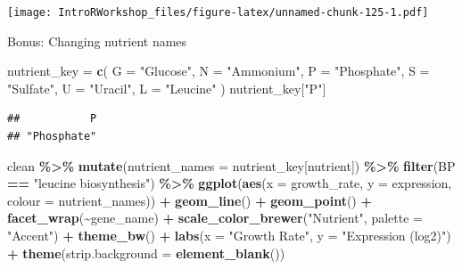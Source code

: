 \documentclass[
]{book}
\newenvironment{Shaded}{\begin{snugshade}}{\end{snugshade}}
\newcommand{\AttributeTok}[1]{\textcolor[rgb]{0.13,0.29,0.53}{#1}}
\newcommand{\FunctionTok}[1]{\textcolor[rgb]{0.13,0.29,0.53}{\textbf{#1}}}
\newcommand{\NormalTok}[1]{#1}
\newcommand{\OtherTok}[1]{\textcolor[rgb]{0.56,0.35,0.01}{#1}}
\newcommand{\SpecialCharTok}[1]{\textcolor[rgb]{0.81,0.36,0.00}{\textbf{#1}}}
\newcommand{\StringTok}[1]{\textcolor[rgb]{0.31,0.60,0.02}{#1}}
\begin{document}
\texttt{[image: IntroRWorkshop\_files/figure-latex/unnamed-chunk-125-1.pdf]}

Bonus: Changing nutrient names

\begin{Shaded}
\begin{Highlighting}[]
\NormalTok{nutrient\_key }\OtherTok{=} \FunctionTok{c}\NormalTok{(}
  \AttributeTok{G =} \StringTok{"Glucose"}\NormalTok{,}
  \AttributeTok{N =} \StringTok{"Ammonium"}\NormalTok{,}
  \AttributeTok{P =} \StringTok{"Phosphate"}\NormalTok{,}
  \AttributeTok{S =} \StringTok{"Sulfate"}\NormalTok{,}
  \AttributeTok{U =} \StringTok{"Uracil"}\NormalTok{,}
  \AttributeTok{L =} \StringTok{"Leucine"}
\NormalTok{)}
\NormalTok{nutrient\_key[}\StringTok{"P"}\NormalTok{]}
\end{Highlighting}
\end{Shaded}

\begin{verbatim}
##           P 
## "Phosphate"
\end{verbatim}

\begin{Shaded}
\begin{Highlighting}[]
\NormalTok{clean }\SpecialCharTok{\%\textgreater{}\%}
  \FunctionTok{mutate}\NormalTok{(}\AttributeTok{nutrient\_names =}\NormalTok{ nutrient\_key[nutrient]) }\SpecialCharTok{\%\textgreater{}\%}
    \FunctionTok{filter}\NormalTok{(BP }\SpecialCharTok{==} \StringTok{"leucine biosynthesis"}\NormalTok{) }\SpecialCharTok{\%\textgreater{}\%}
    \FunctionTok{ggplot}\NormalTok{(}\FunctionTok{aes}\NormalTok{(}\AttributeTok{x =}\NormalTok{ growth\_rate, }\AttributeTok{y =}\NormalTok{ expression, }\AttributeTok{colour =}\NormalTok{ nutrient\_names)) }\SpecialCharTok{+}
    \FunctionTok{geom\_line}\NormalTok{() }\SpecialCharTok{+}
    \FunctionTok{geom\_point}\NormalTok{() }\SpecialCharTok{+}
    \FunctionTok{facet\_wrap}\NormalTok{(}\SpecialCharTok{\textasciitilde{}}\NormalTok{gene\_name) }\SpecialCharTok{+}
    \FunctionTok{scale\_color\_brewer}\NormalTok{(}\StringTok{"Nutrient"}\NormalTok{, }\AttributeTok{palette =} \StringTok{"Accent"}\NormalTok{) }\SpecialCharTok{+}
    \FunctionTok{theme\_bw}\NormalTok{() }\SpecialCharTok{+}
    \FunctionTok{labs}\NormalTok{(}\AttributeTok{x =} \StringTok{"Growth Rate"}\NormalTok{, }\AttributeTok{y =} \StringTok{"Expression (log2)"}\NormalTok{) }\SpecialCharTok{+}
    \FunctionTok{theme}\NormalTok{(}\AttributeTok{strip.background =} \FunctionTok{element\_blank}\NormalTok{())}
\end{Highlighting}
\end{Shaded}
\end{document}

